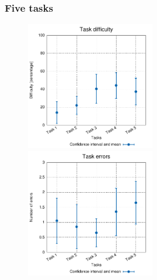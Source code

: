 \documentclass[compress]{beamer}
\begin{document}
	\begin{frame}[c]
		\frametitle{Five tasks}
		\begin{figure}[H]
			\includegraphics[width=0.5\textwidth]{figures/user_diffs.pdf}
			\includegraphics[width=0.5\textwidth]{figures/user_errors.pdf}
		\end{figure}
	\end{frame}
\end{document}
